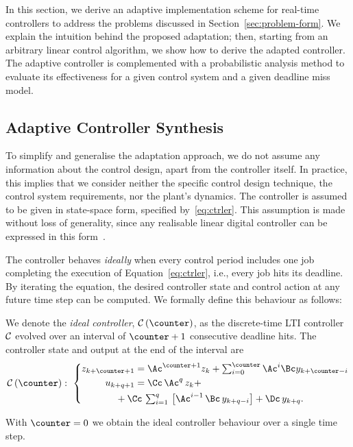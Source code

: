 In this section, we derive an adaptive implementation scheme for real-time controllers to address the problems discussed in Section~\ref{sec:problem-form}.
We explain the intuition behind the proposed adaptation; then, starting from an arbitrary linear control algorithm, we show how to derive the adapted controller.
The adaptive controller is complemented with a probabilistic analysis method to evaluate its effectiveness for a given control system and a given deadline miss model.

\subsection{Adaptive Controller Synthesis}%
\label{sec:adaptation}%
%
To simplify and generalise the adaptation approach, we do not assume any information about the control design, apart from the controller itself. 
In practice, this implies that we consider neither the specific control design technique, the control system requirements, nor the plant's dynamics.
The controller is assumed to be given in state-space form, specified by~\eqref{eq:ctrler}.
This assumption is made without loss of generality, since any realisable linear digital controller can be expressed in this form~\cite{Astrom:2008}.

The controller behaves \emph{ideally} when every control period includes one job completing the execution of Equation~\eqref{eq:ctrler}, i.e., every job hits its deadline.
By iterating the equation, the desired controller state and control action at any future time step can be computed. 
We formally define this behaviour as follows:

\begin{definition}%
    We denote the \emph{ideal controller}, $\ctrler\funof{\counter}$, as the discrete-time LTI controller $\mathcal{C}$ evolved over an interval of $\counter+1$ consecutive deadline hits.
    The controller state and output at the end of the interval are
    \begin{equation}
        \label{eq:ctrler-ideal}
        \ctrler\funof{\counter}:\,\, 
        \left\{\begin{aligned}
            z_{k+\counter+1} &= \Ac^{\counter+1} z_{k} + \textstyle\sum_{i=0}^{\counter} \Ac^i \Bc y_{k+\counter-i}\\
            u_{k+q+1} &= \Cc\, \Ac^{q}\, z_k + \\
                       &\hspace{-2em}+ \Cc\, \textstyle\sum\nolimits_{i=1}^{q}\, \left[ \Ac^{i-1}\, \Bc\, y_{k+q-i}\right] 
                       + \Dc\, y_{k+q}.
        \end{aligned}\right.
    \end{equation}
\end{definition}
With $\counter=0$ we obtain the ideal controller behaviour over a single time step.

